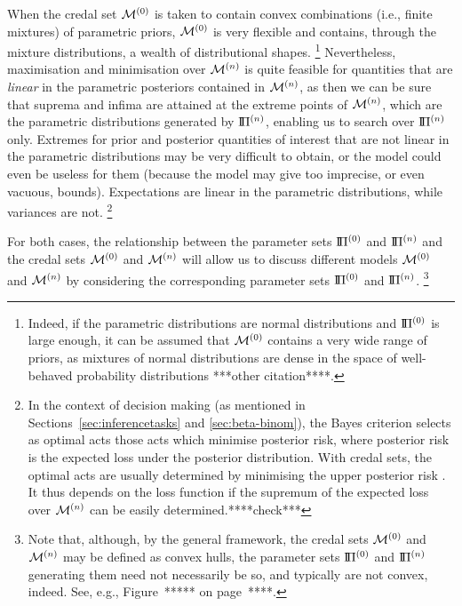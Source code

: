 When the credal set $\mathcal{M}^{(0)}$ is taken to contain convex combinations (i.e., finite mixtures) of parametric priors,
$\mathcal{M}^{(0)}$ is very flexible and contains, through the mixture distributions, a wealth of distributional shapes.%
\footnote{Indeed, if the parametric distributions are normal distributions
and $\text{I}\!\Pi^{(0)}$ is large enough,
it can be assumed that $\mathcal{M}^{(0)}$ contains a very wide range of priors,
as mixtures of normal distributions are dense in the space of well-behaved probability distributions
\parencite[see, e.g.,][p.~44]{2000:priebe}***other citation****.}
Nevertheless, maximisation and minimisation over $\mathcal{M}^{(n)}$
is quite feasible for quantities that are \emph{linear} in the parametric posteriors contained in $\mathcal{M}^{(n)}$,
as then we can be sure that suprema and infima are attained at the extreme points of $\mathcal{M}^{(n)}$,
which are the parametric distributions generated by $\text{I}\!\Pi^{(n)}$, enabling us to search over $\text{I}\!\Pi^{(n)}$ only.
Extremes for prior and posterior quantities of interest that are not linear in the parametric distributions
may be very difficult to obtain,
or the model could even be useless for them (because the model may give too imprecise, or even vacuous, bounds).
Expectations are linear in the parametric distributions, while variances are not.%
\footnote{In the context of decision making (as mentioned in Sections~\ref{sec:inferencetasks} and \ref{sec:beta-binom}),
the Bayes criterion selects as optimal acts those acts which minimise posterior risk,
where posterior risk is the expected loss under the posterior distribution.
With credal sets, the optimal acts are usually determined by minimising the upper posterior risk
\parencite[see, e.g.,][\S 3.2]{itip-decision}.
It thus depends on the loss function if the supremum of the expected loss over $\mathcal{M}^{(n)}$ can be easily determined.****check***}

%

For both cases, the relationship between the parameter sets $\text{I}\!\Pi^{(0)}$ and $\text{I}\!\Pi^{(n)}$ and the credal sets $\mathcal{M}^{(0)}$ and $\mathcal{M}^{(n)}$
will allow us to discuss different models $\mathcal{M}^{(0)}$ and $\mathcal{M}^{(n)}$
by considering the corresponding parameter sets $\text{I}\!\Pi^{(0)}$ and $\text{I}\!\Pi^{(n)}$.%
\footnote{Note that, although, by the general framework, the credal sets $\mathcal{M}^{(0)}$ and $\mathcal{M}^{(n)}$ may be defined as convex hulls,
the parameter sets $\text{I}\!\Pi^{(0)}$ and $\text{I}\!\Pi^{(n)}$ generating them need not necessarily be so, and typically are not convex, indeed.
See, e.g., Figure~***** on page~****.}


